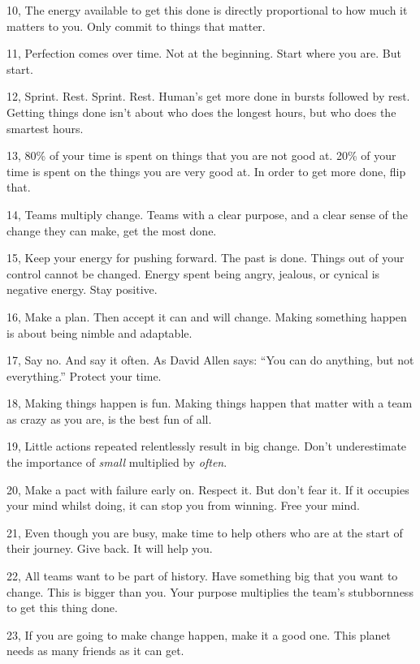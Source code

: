 \documentclass[twocolumn]{article}
\begin{document}
\vfill

10, The energy available to get this done is directly proportional to how much it matters to you. Only commit to things that matter.

\vfill

11, Perfection comes over time. Not at the beginning. Start where you are. But start.

\vfill

12, Sprint. Rest. Sprint. Rest. Human's get more done in bursts followed by rest. Getting things done isn't about who does the longest hours, but who does the smartest hours.

\vfill

13, 80\% of your time is spent on things that you are not good at. 20\% of your time is spent on the things you are very good at. In order to get more done, flip that.

\vfill

14, Teams multiply change. Teams with a clear purpose, and a clear sense of the change they can make, get the most done.

\vfill

15, Keep your energy for pushing forward. The past is done. Things out of your control cannot be changed. Energy spent being angry, jealous, or cynical is negative energy. Stay positive.

\vfill

16, Make a plan. Then accept it can and will change. Making something happen is about being nimble and adaptable.

\vfill

17, Say no. And say it often. As David Allen says: ``You can do anything, but not everything.'' Protect your time.

\vfill

18, Making things happen is fun. Making things happen that matter with a team as crazy as you are, is the best fun of all.

\vfill

19, Little actions repeated relentlessly result in big change. Don't underestimate the importance of \emph{small} multiplied by \emph{often}.

\vfill

20, Make a pact with failure early on. Respect it. But don't fear it. If it occupies your mind whilst doing, it can stop you from winning. Free your mind.

\vfill

21, Even though you are busy, make time to help others who are at the start of their journey. Give back. It will help you.

\vfill

22, All teams want to be part of history. Have something big that you want to change. This is bigger than you. Your purpose multiplies the team's stubbornness to get this thing done.

\vfill

23, If you are going to make change happen, make it a good one. This planet needs as many friends as it can get.

\vfill
\end{document}
